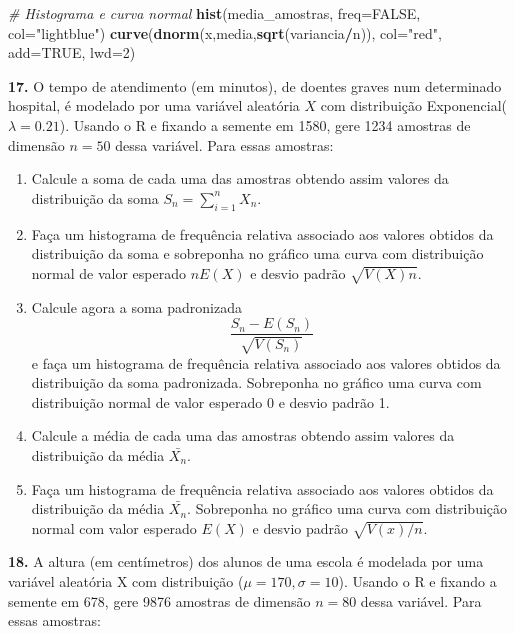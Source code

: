 \documentclass[
]{book}
\newenvironment{Shaded}{\begin{snugshade}}{\end{snugshade}}
\newcommand{\AttributeTok}[1]{\textcolor[rgb]{0.13,0.29,0.53}{#1}}
\newcommand{\CommentTok}[1]{\textcolor[rgb]{0.56,0.35,0.01}{\textit{#1}}}
\newcommand{\ConstantTok}[1]{\textcolor[rgb]{0.56,0.35,0.01}{#1}}
\newcommand{\DecValTok}[1]{\textcolor[rgb]{0.00,0.00,0.81}{#1}}
\newcommand{\FunctionTok}[1]{\textcolor[rgb]{0.13,0.29,0.53}{\textbf{#1}}}
\newcommand{\NormalTok}[1]{#1}
\newcommand{\SpecialCharTok}[1]{\textcolor[rgb]{0.81,0.36,0.00}{\textbf{#1}}}
\newcommand{\StringTok}[1]{\textcolor[rgb]{0.31,0.60,0.02}{#1}}
\begin{document}
\begin{Shaded}
\begin{Highlighting}[]
\CommentTok{\# Histograma e curva normal}
\FunctionTok{hist}\NormalTok{(media\_amostras, }\AttributeTok{freq=}\ConstantTok{FALSE}\NormalTok{, }\AttributeTok{col=}\StringTok{"lightblue"}\NormalTok{)}
\FunctionTok{curve}\NormalTok{(}\FunctionTok{dnorm}\NormalTok{(x,media,}\FunctionTok{sqrt}\NormalTok{(variancia}\SpecialCharTok{/}\NormalTok{n)), }\AttributeTok{col=}\StringTok{"red"}\NormalTok{, }\AttributeTok{add=}\ConstantTok{TRUE}\NormalTok{, }\AttributeTok{lwd=}\DecValTok{2}\NormalTok{)}
\end{Highlighting}
\end{Shaded}

\textbf{17.} O tempo de atendimento (em minutos), de doentes graves num
determinado hospital, é modelado por uma variável aleatória \(X\) com
distribuição Exponencial(\(\lambda=0.21\)). Usando o R e fixando a semente
em 1580, gere 1234 amostras de dimensão \(n=50\) dessa variável. Para
essas amostras:

\begin{enumerate}
\def\labelenumi{(\alph{enumi})}
\item
  Calcule a soma de cada uma das amostras obtendo assim valores da
  distribuição da soma \(S_{n} = \sum_{i=1}^{n}X_{n}\).
\item
  Faça um histograma de frequência relativa associado aos valores
  obtidos da distribuição da soma e sobreponha no gráfico uma curva com
  distribuição normal de valor esperado \(nE(X)\) e desvio padrão
  \(\sqrt{V(X)n}\).
\item
  Calcule agora a soma padronizada
  \[\frac{S_{n}-E(S_{n})}{\sqrt{V(S_{n})}}\] e faça um histograma de
  frequência relativa associado aos valores obtidos da distribuição da
  soma padronizada. Sobreponha no gráfico uma curva com distribuição
  normal de valor esperado 0 e desvio padrão 1.
\item
  Calcule a média de cada uma das amostras obtendo assim valores
  da distribuição da média \(\bar{X_{n}}\).
\item
  Faça um histograma de frequência relativa associado aos valores
  obtidos da distribuição da média \(\bar{X_{n}}\). Sobreponha no gráfico
  uma curva com distribuição normal com valor esperado \(E(X)\) e desvio
  padrão \(\sqrt{V(x)/n}\).
\end{enumerate}

\textbf{18.} A altura (em centímetros) dos alunos de uma escola é modelada
por uma variável aleatória X com distribuição
(\(\mu=170, \sigma=10\)). Usando o R e fixando a semente em
678, gere 9876 amostras de dimensão \(n=80\) dessa variável. Para essas
amostras:
\end{document}
